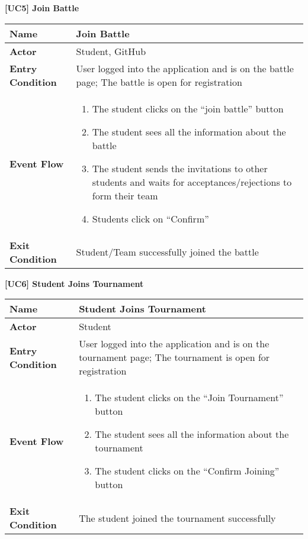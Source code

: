 \documentclass{article}
\begin{document}
\begin{table}
 \renewcommand{\arraystretch}{1.5}
    \centering
    \raggedright\textbf{[UC5] Join Battle}
    \begin{tabular}{|l|p{10cm}|}
        \hline
        \textbf{Name} & Join Battle \\
        \hline
        \textbf{Actor} & Student, GitHub \\
        \hline
        \textbf{Entry Condition} & User logged into the application and is on the battle page;
        The battle is open for registration \\
        \hline
        \textbf{Event Flow} & 
        \begin{enumerate}[align=left, topsep=0pt, partopsep=0pt]
             \item The student clicks on the “join battle” button
             \item The student sees all the information about the battle 
             \item The student sends the invitations to other students and waits for acceptances/rejections to form their team
             \item Students click on “Confirm”
         \end{enumerate} \\
        \hline
        \textbf{Exit Condition} & Student/Team successfully joined the battle \\
        \hline
    \end{tabular}
\end{table}

\begin{table}
 \renewcommand{\arraystretch}{1.5}
    \centering
    \raggedright\textbf{[UC6] Student Joins Tournament}
    \begin{tabular}{|l|p{10cm}|}
        \hline
        \textbf{Name} & Student Joins Tournament \\
        \hline
        \textbf{Actor} & Student \\
        \hline
        \textbf{Entry Condition} & 
        User logged into the application and is on the tournament page; The tournament is open for registration  \\
        \hline
        \textbf{Event Flow} & 
        \begin{enumerate}[align=left, topsep=0pt, partopsep=0pt]
            \item The student clicks on the “Join Tournament” button 
            \item The student sees all the information about the tournament
            \item The student clicks on the “Confirm Joining” button
        \end{enumerate} \\
        \hline
        \textbf{Exit Condition} & The student joined the tournament successfully  \\
        \hline
    \end{tabular}
\end{table}
\end{document}
